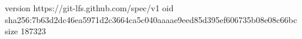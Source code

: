 version https://git-lfs.github.com/spec/v1
oid sha256:7b63d2dc46ea5971d2c3664ca5c040aaaae9eed85d395ef606735b08e08c66bc
size 187323
